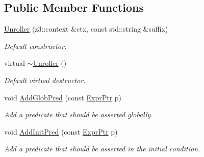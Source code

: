 \subsection*{Public Member Functions}
\begin{DoxyCompactItemize}
\item 
\mbox{\label{classilang_1_1_unroller_a5f4ed388f23e5e61bb386a24d1f7dff0}} 
\mbox{\hyperlink{classilang_1_1_unroller_a5f4ed388f23e5e61bb386a24d1f7dff0}{Unroller}} (z3\+::context \&ctx, const std\+::string \&suffix)
\begin{DoxyCompactList}\small\item\em Default constructor. \end{DoxyCompactList}\item 
\mbox{\label{classilang_1_1_unroller_adb50efaae1d5287854a468ef2862ded5}} 
virtual \mbox{\hyperlink{classilang_1_1_unroller_adb50efaae1d5287854a468ef2862ded5}{$\sim$\+Unroller}} ()
\begin{DoxyCompactList}\small\item\em Default virtual destructor. \end{DoxyCompactList}\item 
\mbox{\label{classilang_1_1_unroller_a3a06ed554c558b30e43399bad847a1d6}} 
void \mbox{\hyperlink{classilang_1_1_unroller_a3a06ed554c558b30e43399bad847a1d6}{Add\+Glob\+Pred}} (const \mbox{\hyperlink{namespaceilang_a7c4196c72e53ea4df4b7861af7bc3bce}{Expr\+Ptr}} p)
\begin{DoxyCompactList}\small\item\em Add a predicate that should be asserted globally. \end{DoxyCompactList}\item 
\mbox{\label{classilang_1_1_unroller_a10a5eb1cb377d4bd5f66a90d3a565288}} 
void \mbox{\hyperlink{classilang_1_1_unroller_a10a5eb1cb377d4bd5f66a90d3a565288}{Add\+Init\+Pred}} (const \mbox{\hyperlink{namespaceilang_a7c4196c72e53ea4df4b7861af7bc3bce}{Expr\+Ptr}} p)
\begin{DoxyCompactList}\small\item\em Add a predicate that should be asserted in the initial condition. \end{DoxyCompactList}\item 
\mbox{\label{classilang_1_1_unroller_aa2f3cab7936d73eabadbf65625be0d00}} 

\end{DoxyCompactItemize}
